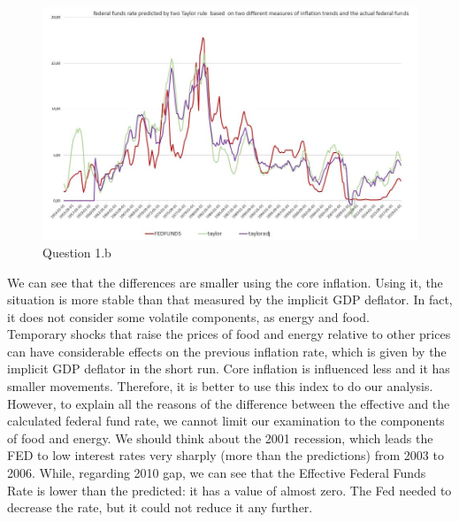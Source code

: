 \documentclass[	11pt, ]{fphw}
\begin{document}
\subsection{}
\begin{figure}[h] 
\centering 
\includegraphics[scale=0.7]{es5b.JPG} 
\caption{Question 1.b} 
\label{11}
\end{figure}
We can see that the differences are smaller using the core inflation. Using it, the situation is more stable than that measured by the implicit GDP deflator. In fact, it does not consider some volatile components, as energy and food. \\
Temporary shocks that raise the prices of food and energy relative to other prices can have considerable effects on the previous inflation rate, which is given by the implicit GDP deflator in the short run. Core inflation is influenced less and it has smaller movements. Therefore, it is better to use this index to do our analysis. \\

However, to explain all the reasons of the difference between the effective and the calculated federal fund rate, we cannot limit our examination to the components of food and energy. 
We should think about the 2001 recession, which leads the FED to low interest rates very sharply (more than the predictions) from 2003 to 2006. While, regarding 2010 gap, we can see that the Effective Federal Funds Rate is lower than the predicted: it has a value of almost zero.  The Fed needed to decrease the rate, but it could not reduce it any further. 

\newpage
\section{}
\end{document}
